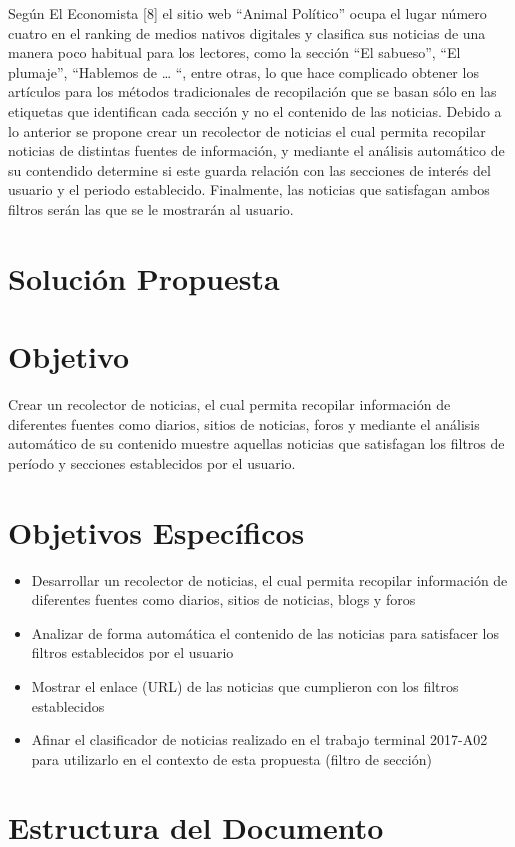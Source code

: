 Según El Economista [8] el sitio web “Animal Político” ocupa el lugar número cuatro en el ranking de medios nativos digitales y clasifica sus noticias de una manera poco habitual para los lectores, como la sección “El sabueso”, “El plumaje”, “Hablemos de … “, entre otras, lo que hace complicado obtener los artículos para los métodos tradicionales de recopilación que se basan sólo en las etiquetas que identifican cada sección y no el contenido de las noticias.
Debido a lo anterior se propone crear un recolector de noticias el cual permita recopilar noticias de distintas fuentes de información, y mediante el análisis automático de su contendido determine si este guarda relación con las secciones de interés del usuario y el periodo establecido. Finalmente, las noticias que satisfagan ambos filtros serán las que se le mostrarán al usuario.

\section{Solución Propuesta}

\section{Objetivo}

  Crear un recolector de noticias, el cual permita recopilar información de diferentes fuentes como diarios, sitios de noticias, foros y mediante el análisis automático de su contenido muestre aquellas noticias que satisfagan los filtros de período y secciones establecidos por el usuario.
  

\section{Objetivos Específicos}
\begin{itemize}
  \item Desarrollar un recolector de noticias, el cual permita recopilar información de diferentes fuentes como diarios, sitios de noticias, blogs y foros
  \item Analizar de forma automática el contenido de las noticias para satisfacer los filtros establecidos por el usuario
  \item Mostrar el enlace (URL) de las noticias que cumplieron con los filtros establecidos
  \item Afinar el clasificador de noticias realizado en el trabajo terminal 2017-A02 para utilizarlo en el contexto de esta propuesta (filtro de sección) 

\end{itemize}
\section{Estructura del Documento}